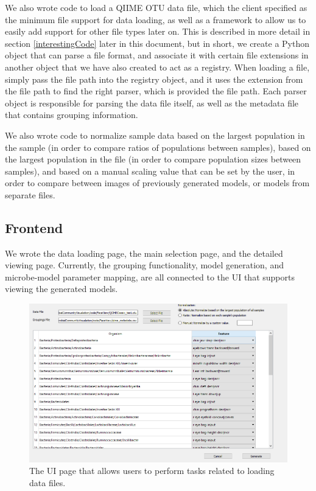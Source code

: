 \documentclass[letterpaper,10pt, onecolumn, draftclsnofoot]{IEEEtran}
\begin{document}
We also wrote code to load a QIIME OTU data file, which the client specified as the minimum file support for data loading, as well as a framework to allow us to easily add support for other file types later on. This is described in more detail in section \ref{interestingCode} later in this document, but in short, we create a Python object that can parse a file format, and associate it with certain file extensions in another object that we have also created to act as a registry. When loading a file, simply pass the file path into the registry object, and it uses the extension from the file path to find the right parser, which is provided the file path. Each parser object is responsible for parsing the data file itself, as well as the metadata file that contains grouping information.

We also wrote code to normalize sample data based on the largest population in the sample (in order to compare ratios of populations between samples), based on the largest population in the file (in order to compare population sizes between samples), and based on a manual scaling value that can be set by the user, in order to compare between images of previously generated models, or models from separate files.

\subsection{Frontend}

We wrote the data loading page, the main selection page, and the detailed viewing page. Currently, the grouping functionality, model generation, and microbe-model parameter mapping, are all connected to the UI that supports viewing the generated models.

\begin{figure}
	\includegraphics[width=\textwidth]{loading.PNG}
	\caption{The UI page that allows users to perform tasks related to loading data files.}
	\label{fig:LoadingInterface}
\end{figure}
\end{document}
